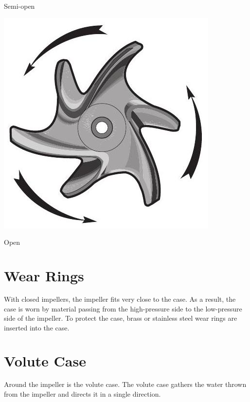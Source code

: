 \documentclass[10pt]{article}
\begin{document}
Semi-open

\includegraphics[max width=\textwidth]{CentrifugalPumpOpenImpeller}

Open

\section{Wear Rings}
With closed impellers, the impeller fits very close to the case. As a result, the case is worn by material passing from the high-pressure side to the low-pressure side of the impeller. To protect the case, brass or stainless steel wear rings are inserted into the case.

\section{Volute Case}
Around the impeller is the volute case. The volute case gathers the water thrown from the impeller and directs it in a single direction.\\
\end{document}
